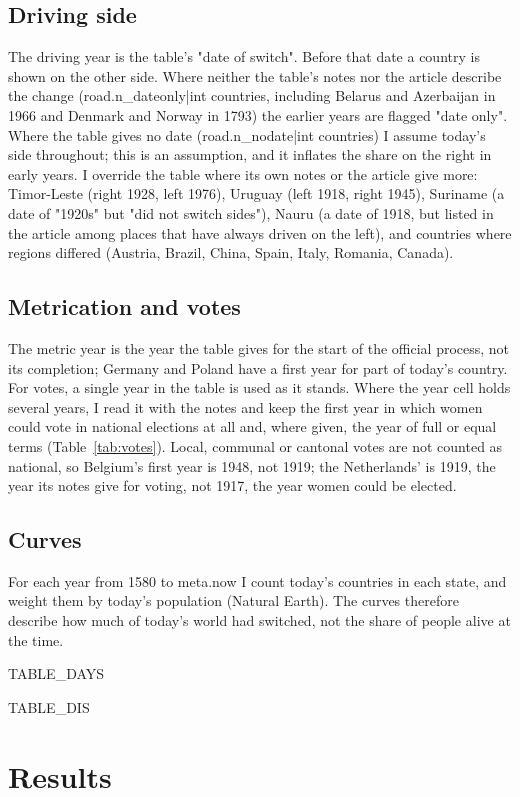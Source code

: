 \documentclass[11pt,a4paper]{article}
\begin{document}
\subsection{Driving side}
The driving year is the table's "date of switch". Before that date a country is shown on the other side. Where neither the table's notes nor the article describe the change ({{road.n_dateonly|int}} countries, including Belarus and Azerbaijan in 1966 and Denmark and Norway in 1793) the earlier years are flagged "date only". Where the table gives no date ({{road.n_nodate|int}} countries) I assume today's side throughout; this is an assumption, and it inflates the share on the right in early years. I override the table where its own notes or the article give more: Timor-Leste (right 1928, left 1976), Uruguay (left 1918, right 1945), Suriname (a date of "1920s" but "did not switch sides"), Nauru (a date of 1918, but listed in the article among places that have always driven on the left), and countries where regions differed (Austria, Brazil, China, Spain, Italy, Romania, Canada).

\subsection{Metrication and votes}
The metric year is the year the table gives for the start of the official process, not its completion; Germany and Poland have a first year for part of today's country. For votes, a single year in the table is used as it stands. Where the year cell holds several years, I read it with the notes and keep the first year in which women could vote in national elections at all and, where given, the year of full or equal terms (Table~\ref{tab:votes}). Local, communal or cantonal votes are not counted as national, so Belgium's first year is 1948, not 1919; the Netherlands' is 1919, the year its notes give for voting, not 1917, the year women could be elected.

\subsection{Curves}
For each year from 1580 to {{meta.now}} I count today's countries in each state, and weight them by today's population (Natural Earth). The curves therefore describe how much of today's world had switched, not the share of people alive at the time.

{{TABLE_DAYS}}

{{TABLE_DIS}}

\section{Results}
\end{document}
